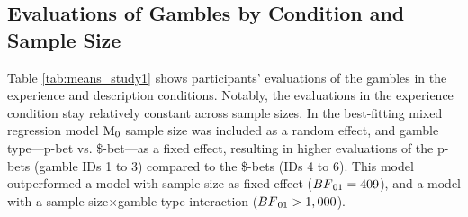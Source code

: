 \documentclass[a4paper, man, floatsintext]{apa6}
\title{}
\author{Jana B. Jarecki}
\date{17 September, 2019}
\begin{document}
\subsection{Evaluations of Gambles by Condition and Sample Size}

Table \ref{tab:means_study1} shows participants' evaluations of the
gambles in the experience and description conditions. Notably, the
evaluations in the experience condition stay relatively constant across
sample sizes. In the best-fitting mixed regression model
\(\mathrm{M}\textsubscript{0}\) sample size was included as a random
effect, and gamble type---p-bet vs. \$-bet---as a fixed effect,
resulting in higher evaluations of the p-bets (gamble IDs 1 to 3)
compared to the \$-bets (IDs 4 to 6). This model outperformed a model
with sample size as fixed effect (\(BF\textsubscript{01} = 409\)), and a
model with a sample-size\(\times\)gamble-type interaction
(\(BF\textsubscript{01} > 1,000\)).
\end{document}
